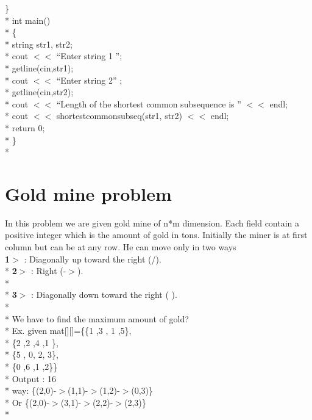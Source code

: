 \documentclass[12pt]{book}
\begin{document}
\} \\*
int main()\\*
\{\\*
\phantom{x} \hspace{3ex}    string str1, str2;\\*
\phantom{x} \hspace{3ex}    cout $<<$ “Enter string 1 ”;\\*
\phantom{x} \hspace{3ex}    getline(cin,str1);\\*
\phantom{x} \hspace{3ex}    cout $<<$ “Enter string 2” ;\\*
\phantom{x} \hspace{3ex} \phantom{x} \hspace{3ex}       getline(cin,str2);\\*
\phantom{x} \hspace{3ex}    cout $<<$ “Length of the shortest common subsequence is ” $<<$ endl;\\*
\phantom{x} \hspace{3ex}    cout $<<$ shortestcommonsubseq(str1, str2) $<<$ endl;\\*
\phantom{x} \hspace{3ex}    return 0;\\*
\}\\*

\chapter{Gold mine problem}
In this problem we are given gold mine of  n*m dimension. Each field contain a positive integer which is the amount of gold in tons. Initially the miner is at first column  but can be at any row. He can move only in two ways \\
\textbf{1$>$} : Diagonally up toward the right (/). \\*
\textbf{2$>$} : Right (-$>$).\\*\\*
\textbf{3$>$} : Diagonally down toward the right ( ).\\*\\*
We have to find the maximum amount of gold? \\*
Ex. given mat[][]=\{\{1 ,3 , 1 ,5\},\\*
             \{2 ,2 ,4 ,1 \},\\*
             \{5 , 0, 2, 3\},\\*
             \{0 ,6 ,1 ,2\}\}\\*
Output : 16  \\*
        way: \{(2,0)-$>$(1,1)-$>$(1,2)-$>$(0,3)\}\\*
            Or \{(2,0)-$>$(3,1)-$>$(2,2)-$>$(2,3)\}\\*
\end{document}
